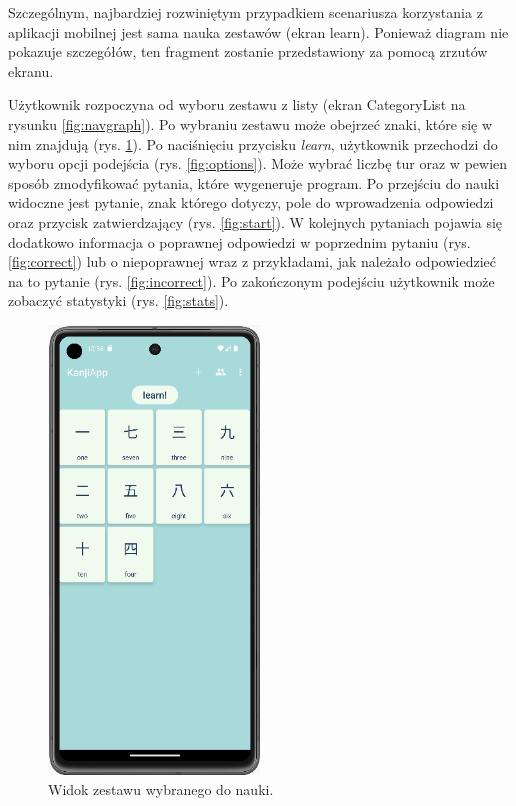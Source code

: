 \documentclass[a4paper,twoside,12pt]{book}
\begin{document}
Szczególnym, najbardziej rozwiniętym przypadkiem scenariusza korzystania z aplikacji mobilnej jest sama nauka zestawów (ekran learn). Ponieważ diagram nie pokazuje szczegółów, ten fragment zostanie przedstawiony za pomocą zrzutów ekranu. 

Użytkownik rozpoczyna od wyboru zestawu z listy (ekran CategoryList na rysunku \ref{fig:navgraph}). Po wybraniu zestawu może obejrzeć znaki, które się w nim znajdują (rys. \ref{fig:list}). Po naciśnięciu przycisku \textit{learn}, użytkownik przechodzi do wyboru opcji podejścia (rys. \ref{fig:options}). Może wybrać liczbę tur oraz w pewien sposób zmodyfikować pytania, które wygeneruje program.  Po przejściu do nauki widoczne jest pytanie, znak którego dotyczy, pole do wprowadzenia odpowiedzi oraz przycisk zatwierdzający (rys. \ref{fig:start}). W kolejnych pytaniach pojawia się dodatkowo informacja o poprawnej odpowiedzi w poprzednim pytaniu (rys. \ref{fig:correct}) lub o niepoprawnej wraz z przykładami, jak należało odpowiedzieć na to pytanie (rys. \ref{fig:incorrect}). Po zakończonym podejściu użytkownik może zobaczyć statystyki (rys. \ref{fig:stats}).


\begin{figure}[]
\centering
\includegraphics[width=0.5\textwidth]{learn/list}
\caption{Widok zestawu wybranego do nauki.}
\label{fig:list}
\end{figure}
\end{document}
